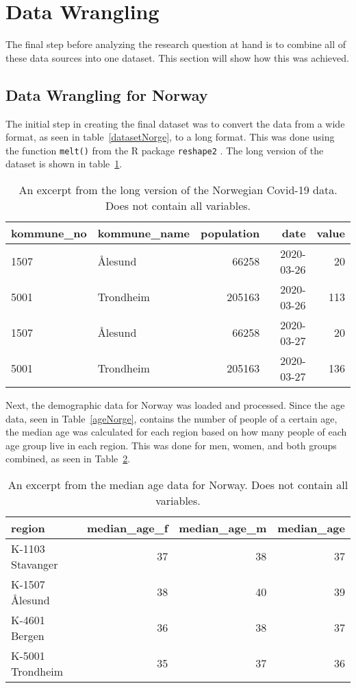 \section{Data Wrangling}
The final step before analyzing the research question at hand is to combine all of these data sources into one dataset. This section will show how this was achieved.
\subsection*{Data Wrangling for Norway}
The initial step in creating the final dataset was to convert the data from a wide format, as seen in table~\ref{datasetNorge}, to a long format. This was done using the function \texttt{melt()} from the R package \texttt{reshape2} \cite{reshape2}. The long version of the dataset is shown in table~\ref{norwayLong}.
\begin{table}[H] 
\caption{An excerpt from the long version of the Norwegian Covid-19 data. Does not contain all variables.\label{norwayLong}}
\begin{tabular}{l l r r r}
\toprule
\textbf{kommune\_no}	& \textbf{kommune\_name}	& \textbf{population} & \textbf{date} & \textbf{value}\\
\midrule
1507 & Ålesund & 66258 & 2020-03-26 & 20\\
5001 & Trondheim  & 205163  & 2020-03-26 & 113\\
1507 & Ålesund & 66258 & 2020-03-27 & 20\\
5001 & Trondheim  & 205163  & 2020-03-27 & 136\\
\bottomrule
\end{tabular}
\end{table}
Next, the demographic data for Norway was loaded and processed. Since the age data, seen in Table~\ref{ageNorge}, contains the number of people of a certain age, the median age was calculated for each region based on how many people of each age group live in each region. This was done for men, women, and both groups combined, as seen in Table~\ref{medianNorway}.
\begin{table}[H] 
\caption{An excerpt from the median age data for Norway. Does not contain all variables.\label{medianNorway}}
\begin{tabular}{l r r r}
\toprule
\textbf{region}	& \textbf{median\_age\_f} & \textbf{median\_age\_m} & \textbf{median\_age}\\
\midrule
K-1103 Stavanger & 37 & 38 & 37\\
K-1507 Ålesund & 38 & 40 & 39\\
K-4601 Bergen  & 36  & 38 & 37\\
K-5001 Trondheim  & 35  & 37 & 36\\
\bottomrule
\end{tabular}
\end{table}
